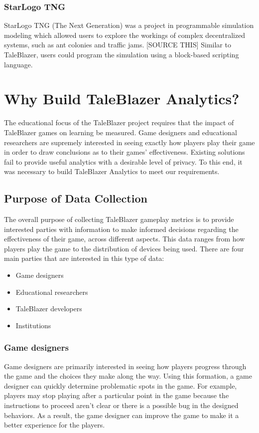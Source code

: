 \subsubsection{StarLogo TNG}

StarLogo TNG (The Next Generation) was a project in programmable simulation modeling which allowed users to explore the workings of complex decentralized systems, such as ant colonies and traffic jams. [SOURCE THIS] Similar to TaleBlazer, users could program the simulation using a block-based scripting language. 

\section{Why Build TaleBlazer Analytics?}

The educational focus of the TaleBlazer project requires that the impact of TaleBlazer games on learning be measured. Game designers and educational researchers are supremely interested in seeing exactly how players play their game in order to draw conclusions as to their games' effectiveness. Existing solutions fail to provide useful analytics with a desirable level of privacy. To this end, it was necessary to build TaleBlazer Analytics to meet our requirements. 

\subsection{Purpose of Data Collection}

The overall purpose of collecting TaleBlazer gameplay metrics is to provide interested parties with information to make informed decisions regarding the effectiveness of their game, across different aspects. This data ranges from how players play the game to the distribution of devices being used. There are four main parties that are interested in this type of data: 
	\begin{itemize}
		\item Game designers
		\item Educational researchers
		\item TaleBlazer developers
		\item Institutions
	\end{itemize}

\subsubsection{Game designers}
Game designers are primarily interested in seeing how players progress through the game and the choices they make along the way. Using this formation, a game designer can quickly determine problematic spots in the game. For example, players may stop playing after a particular point in the game because the instructions to proceed aren't clear or there is a possible bug in the designed behaviors. As a result, the game designer can improve the game to make it a better experience for the players.

